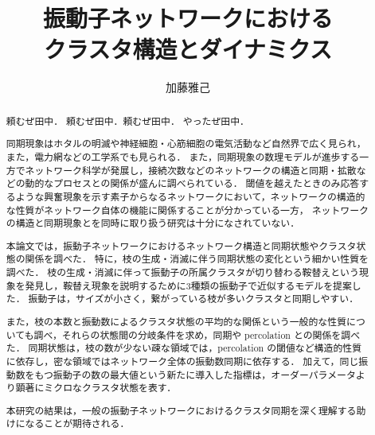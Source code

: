\documentclass[system, bachelor]{systemB}%
\title{振動子ネットワークにおける\\クラスタ構造とダイナミクス}
\author{加藤雅己}
\theoremstyle{break}
\begin{document}
\maketitle%

\frontmatter%



\begin{abstract}%
  頼むぜ田中．
  頼むぜ田中．頼むぜ田中．
  やったぜ田中．
  
  同期現象はホタルの明滅や神経細胞・心筋細胞の電気活動など自然界で広く見られ，また，電力網などの工学系でも見られる．
  また，同期現象の数理モデルが進歩する一方でネットワーク科学が発展し，接続次数などのネットワークの構造と同期・拡散などの動的なプロセスとの関係が盛んに調べられている．  
  閾値を越えたときのみ応答するような興奮現象を示す素子からなるネットワークにおいて，ネットワークの構造的な性質がネットワーク自体の機能に関係することが分かっている一方，
  ネットワークの構造と同期現象とを同時に取り扱う研究は十分になされていない．
  
  本論文では，振動子ネットワークにおけるネットワーク構造と同期状態やクラスタ状態の関係を調べた．
  特に，枝の生成・消滅に伴う同期状態の変化という細かい性質を調べた．
  枝の生成・消滅に伴って振動子の所属クラスタが切り替わる鞍替えという現象を発見し，鞍替え現象を説明するために3種類の振動子で近似するモデルを提案した．
  振動子は，サイズが小さく，繋がっている枝が多いクラスタと同期しやすい．
  
  また，枝の本数と振動数によるクラスタ状態の平均的な関係という一般的な性質についても調べ，それらの状態間の分岐条件を求め，同期や percolation との関係を調べた．
  同期状態は，枝の数が少ない疎な領域では，percolation の閾値など構造的性質に依存し，密な領域ではネットワーク全体の振動数同期に依存する．
  加えて，同じ振動数をもつ振動子の数の最大値という新たに導入した指標は，オーダーパラメータより顕著にミクロなクラスタ状態を表す．
  
  本研究の結果は，一般の振動子ネットワークにおけるクラスタ同期を深く理解する助けになることが期待される．
\end{abstract}


{\makeatletter
\let\ps@jpl@in\ps@empty
\makeatother
\pagestyle{empty}
\tableofcontents
\clearpage}
\end{document}
